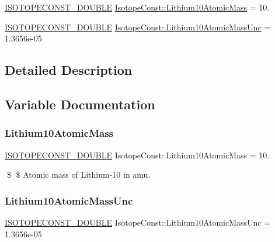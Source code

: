 \begin{DoxyCompactItemize}
\item 
\mbox{\hyperlink{group___isotope_const-_macros_ga8f45a7272ce02c0b4c65c44636ed719a}{I\+S\+O\+T\+O\+P\+E\+C\+O\+N\+S\+T\+\_\+\+D\+O\+U\+B\+LE}} \mbox{\hyperlink{group___isotope_const-_lithium-_li10_ga1d7f63691aaf4b0b19482a8c80310828}{Isotope\+Const\+::\+Lithium10\+Atomic\+Mass}} = 10.
\item 
\mbox{\hyperlink{group___isotope_const-_macros_ga8f45a7272ce02c0b4c65c44636ed719a}{I\+S\+O\+T\+O\+P\+E\+C\+O\+N\+S\+T\+\_\+\+D\+O\+U\+B\+LE}} \mbox{\hyperlink{group___isotope_const-_lithium-_li10_gabbc269e36a626853c0fec40fdb079bf5}{Isotope\+Const\+::\+Lithium10\+Atomic\+Mass\+Unc}} = 1.\+3656e-\/05
\end{DoxyCompactItemize}


\subsection{Detailed Description}


\subsection{Variable Documentation}
\mbox{\label{group___isotope_const-_lithium-_li10_ga1d7f63691aaf4b0b19482a8c80310828}} 
\subsubsection{\texorpdfstring{Lithium10\+Atomic\+Mass}{Lithium10AtomicMass}}
{\footnotesize\ttfamily \mbox{\hyperlink{group___isotope_const-_macros_ga8f45a7272ce02c0b4c65c44636ed719a}{I\+S\+O\+T\+O\+P\+E\+C\+O\+N\+S\+T\+\_\+\+D\+O\+U\+B\+LE}} Isotope\+Const\+::\+Lithium10\+Atomic\+Mass = 10.}

\$ \$ Atomic mass of Lithium-\/10 in amu. \mbox{\label{group___isotope_const-_lithium-_li10_gabbc269e36a626853c0fec40fdb079bf5}} 
\subsubsection{\texorpdfstring{Lithium10\+Atomic\+Mass\+Unc}{Lithium10AtomicMassUnc}}
{\footnotesize\ttfamily \mbox{\hyperlink{group___isotope_const-_macros_ga8f45a7272ce02c0b4c65c44636ed719a}{I\+S\+O\+T\+O\+P\+E\+C\+O\+N\+S\+T\+\_\+\+D\+O\+U\+B\+LE}} Isotope\+Const\+::\+Lithium10\+Atomic\+Mass\+Unc = 1.\+3656e-\/05}

